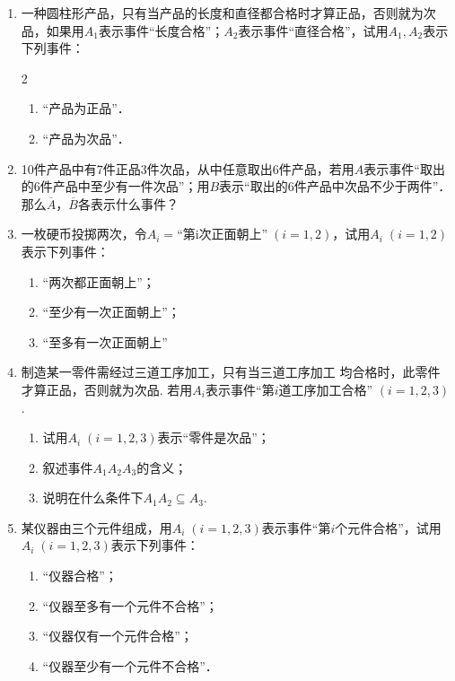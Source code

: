 \begin{enumerate}
    \item 一种圆柱形产品，只有当产品的长度和直径都合格时才算正品，否则就为次品，如果用$A_1$表示事件“长度合格”；$A_2$表示事件“直径合格”，试用$A_1,A_2$表示下列事件：
\begin{multicols}{2}
  \begin{enumerate}[(1)]
\item “产品为正品”．
\item “产品为次品”．
\end{enumerate}  
\end{multicols}

\item     10件产品中有7件正品3件次品，从中任意取出6件产品，若用$A$表示事件“取出的6件产品中至少有一件次品”；用$B$表示“取出的6件产品中次品不少于两件”．那么$\overline{A}$，$\overline{B}$各表示什么事件？
  \item   一枚硬币投掷两次，令$A_i=\text{“第i次正面朝上”}\; (i=1,2)$，试用$A_i\; (i=1,2)$表示下列事件：
\begin{enumerate}[(1)]
\item “两次都正面朝上”；
\item “至少有一次正面朝上”；
\item “至多有一次正面朝上”
\end{enumerate}

\item 制造某一零件需经过三道工序加工，只有当三道工序加工
均合格时，此零件才算正品，否则就为次品. 若用$A_i$表示事件“第$i$道工序加工合格” $(i=1,2,3)$. 
\begin{enumerate}[(1)]
    \item 试用$A_i\; (i=1,2,3)$表示“零件是次品”；
    \item 叙述事件$A_1A_2A_3$的含义；
    \item 说明在什么条件下$A_1A_2\subseteq A_3$.
\end{enumerate}

\item 某仪器由三个元件组成，用$A_i\; (i=1,2,3)$表示事件“第$i$个元件合格”，试用$A_i\; (i=1,2,3)$表示下列事件：
\begin{enumerate}[(1)]
\item “仪器合格”；
\item “仪器至多有一个元件不合格”；
\item “仪器仅有一个元件合格”；
\item “仪器至少有一个元件不合格”．
\end{enumerate}


\end{enumerate}
